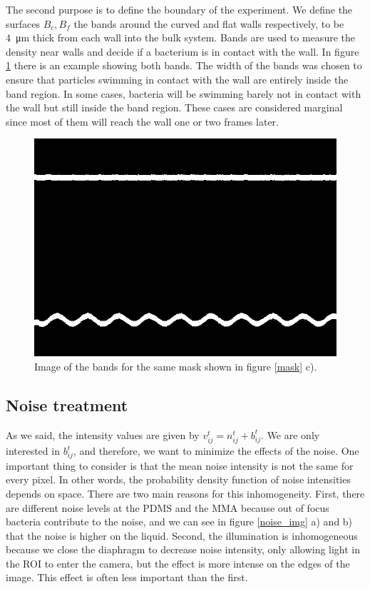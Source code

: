 The second purpose is to define the boundary of the experiment. We define the surfaces $B_{c},B_{f}$ the bands around the curved and flat walls respectively, to be \SI{4}{\micro\meter} thick from each wall into the bulk system. Bands are used to measure the density near walls and decide if a bacterium is in contact with the wall.  In figure \ref{bands} there is an example showing both bands. The width of the bands was chosen to ensure that particles swimming in contact with the wall are entirely inside the band region. In some cases, bacteria will be swimming barely not in contact with the wall but still inside the band region. These cases are considered marginal since most of them will reach the wall one or two frames later.

\begin{figure}
\centering
\includegraphics[width=\linewidth,angle=0]{imagenes/bandas22.10.21_A=3_L=21.png}
\caption[Bands example]{Image of the bands for the same mask shown in figure \ref{mask} c).}
\label{bands}
\end{figure}

\newpage

\subsection{Noise treatment}

As we said, the intensity values are given by $v_{ij}^t  = n_{ij}^t +  b_{ij}^t$. We are only interested in $b_{ij}^t$, and therefore, we want to minimize the effects of the noise. One important thing to consider is that the mean noise intensity is not the same for every pixel. In other words, the probability density function of noise intensities depends on space. There are two main reasons for this inhomogeneity. First, there are different noise levels at the PDMS and the MMA because out of focus bacteria contribute to the noise, and we can see in figure \ref{noise_img} a) and b) that the noise is higher on the liquid. Second, the illumination is inhomogeneous because we close the diaphragm to decrease noise intensity, only allowing light in the ROI to enter the camera, but the effect is more intense on the edges of the image. This effect is often less important than the first.

